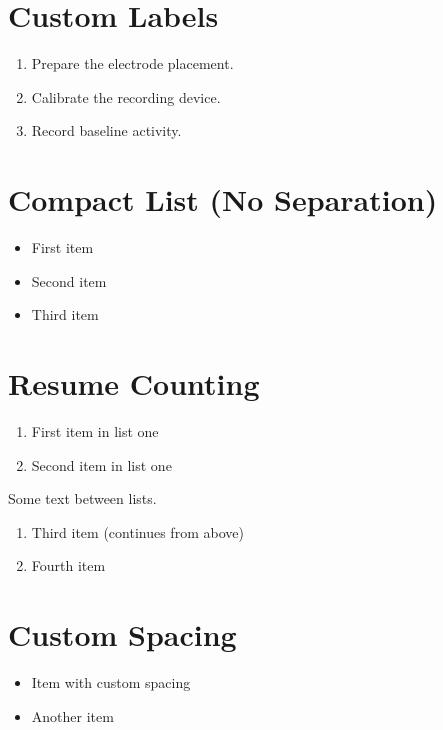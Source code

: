 \documentclass[12pt, a4paper]{article}
\begin{document}
\section*{Custom Labels}
\begin{enumerate}[label=\textbf{Step \arabic*:}, leftmargin=2.5cm]
  \item Prepare the electrode placement.
  \item Calibrate the recording device.
  \item Record baseline activity.
\end{enumerate}

\section*{Compact List (No Separation)}
\begin{itemize}[nosep, label=$\bullet$]
  \item First item
  \item Second item
  \item Third item
\end{itemize}

\section*{Resume Counting}
\begin{enumerate}
  \item First item in list one
  \item Second item in list one
\end{enumerate}

Some text between lists.

\begin{enumerate}[resume]
  \item Third item (continues from above)
  \item Fourth item
\end{enumerate}

\section*{Custom Spacing}
\begin{itemize}[itemsep=10pt, parsep=0pt, topsep=5pt]
  \item Item with custom spacing
  \item Another item
\end{itemize}
\end{document}

